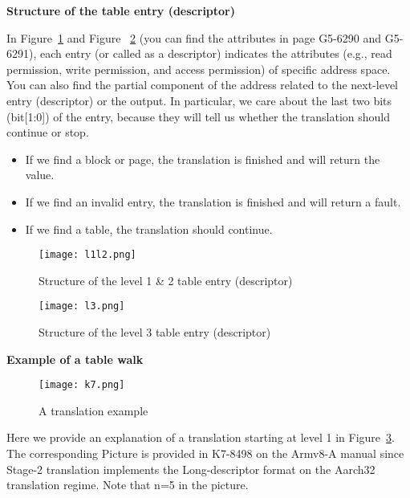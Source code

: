 \vspace{10pt}
\textbf{Structure of the table entry (descriptor)}
\vspace{10pt}

In Figure~\ref{fig:l1l2} and Figure ~\ref{fig:l3} (you can find the attributes in page G5-6290 and G5-6291),
each entry (or called as a descriptor) indicates the attributes (e.g., read permission, write permission, and access permission) of specific address space.
You can also find the partial component of the address related to the next-level entry (descriptor) or the output.
In particular, we care about the last two bits (bit[1:0]) of the entry, because they will tell us whether the translation should continue or stop. 

\begin{itemize}
	\item If we find a block or page, the translation is finished and will return the value.
	\item If we find an invalid entry, the translation is finished and will return a fault.
	\item If we find a table, the translation should continue.
\end{itemize}

\begin{figure}[htb]
	\centering
	\texttt{[image: l1l2.png]}
	\caption{Structure of the level 1 \& 2 table entry (descriptor)}
	\label{fig:l1l2}
\end{figure}

\begin{figure}[htb]
	\centering
	\texttt{[image: l3.png]}
	\caption{Structure of the level 3 table entry (descriptor)}
	\label{fig:l3}
\end{figure}

\vspace{10pt}
\textbf{Example of a table walk}
\vspace{10pt}


\begin{figure}[htbp]
	\centering
	\texttt{[image: k7.png]}
	\caption{A translation example}
	\label{fig:k7}
\end{figure}

Here we provide an explanation of a translation starting at level 1 in Figure~\ref{fig:k7}. The corresponding Picture is provided in K7-8498 on the Armv8-A manual since Stage-2 translation implements the Long-descriptor format on the Aarch32 translation regime. Note that n=5 in the picture.

